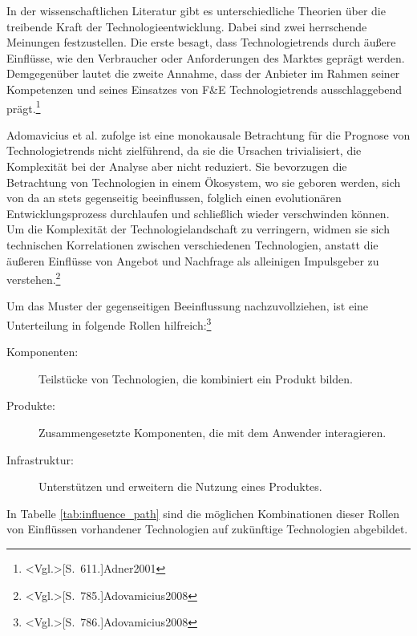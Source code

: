 In der wissenschaftlichen Literatur gibt es unterschiedliche Theorien über die treibende Kraft der Technologieentwicklung. Dabei sind zwei herrschende Meinungen festzustellen. Die erste besagt, dass Technologietrends durch äußere Einflüsse, wie den Verbraucher oder Anforderungen des Marktes geprägt werden. Demgegenüber lautet die zweite Annahme, dass der Anbieter im Rahmen seiner Kompetenzen und seines Einsatzes von F\&E Technologietrends ausschlaggebend prägt.\footnote{\citeNP<Vgl.>[S.~611.]{Adner2001}}

Adomavicius et al. zufolge ist eine monokausale Betrachtung für die Prognose von Technologietrends nicht zielführend, da sie die Ursachen trivialisiert, die Komplexität bei der Analyse aber nicht reduziert. Sie bevorzugen die Betrachtung von Technologien in einem Ökosystem, wo sie geboren werden, sich von da an stets gegenseitig beeinflussen, folglich einen evolutionären Entwicklungsprozess durchlaufen und schließlich wieder verschwinden können. Um die Komplexität der Technologielandschaft zu verringern, widmen sie sich technischen Korrelationen zwischen verschiedenen Technologien, anstatt die äußeren Einflüsse von Angebot und Nachfrage als alleinigen Impulsgeber zu verstehen.\footnote{\citeNP<Vgl.>[S.~785.]{Adovamicius2008}}

Um das Muster der gegenseitigen Beeinflussung nachzuvollziehen, ist eine Unterteilung in folgende Rollen hilfreich:\footnote{\citeNP<Vgl.>[S.~786.]{Adovamicius2008}}
\begin{description}
	\item[Komponenten:] Teilstücke von Technologien, die kombiniert ein Produkt bilden.
	\item[Produkte:] Zusammengesetzte Komponenten, die mit dem Anwender interagieren.
	\item[Infrastruktur:] Unterstützen und erweitern die Nutzung eines Produktes.
\end{description}

In Tabelle \ref{tab:influence_path} sind die möglichen Kombinationen dieser Rollen von Einflüssen vorhandener Technologien auf zukünftige Technologien abgebildet.

